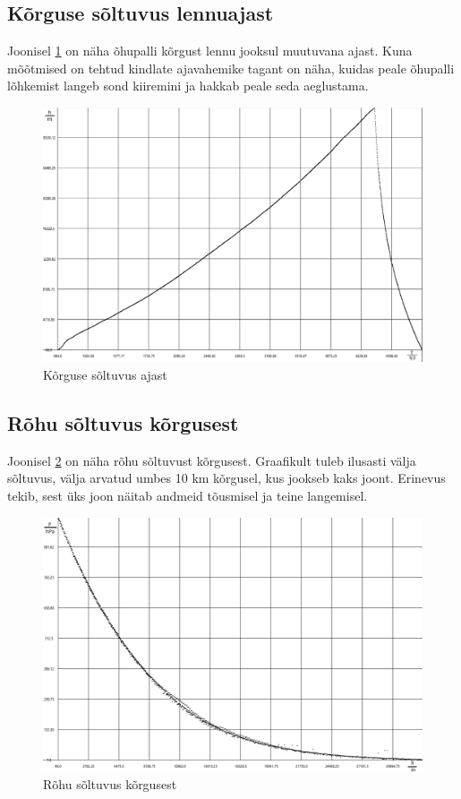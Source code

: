 \documentclass{trkut}%
\begin{document}
\subsection{Kõrguse sõltuvus lennuajast}
Joonisel \ref{NK_H_T} on näha õhupalli kõrgust lennu jooksul muutuvana ajast. Kuna mõõtmised on tehtud kindlate ajavahemike tagant on näha, kuidas peale õhupalli lõhkemist langeb sond kiiremini ja hakkab peale seda aeglustama. %
\begin{figure}[h]
	\includegraphics[width=1\textwidth]{NK_H_T.png}
	\caption{Kõrguse sõltuvus ajast}
	\label{NK_H_T}%
\end{figure}


\subsection{Rõhu sõltuvus kõrgusest}
Joonisel \ref{NK_R_H} on näha rõhu sõltuvust kõrgusest. Graafikult tuleb ilusasti välja sõltuvus, välja arvatud umbes 10 km kõrgusel, kus jookseb kaks joont. Erinevus tekib, sest üks joon näitab andmeid tõusmisel ja teine langemisel.
\begin{figure}[h]
	\includegraphics[width=1\textwidth]{NK_R_H.png}
	\caption{Rõhu sõltuvus kõrgusest}
	\label{NK_R_H}%
\end{figure}
\end{document}
